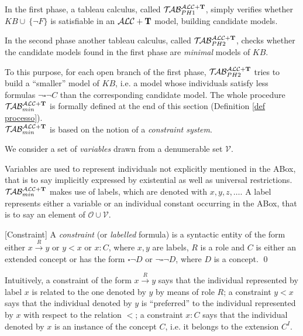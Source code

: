 \documentclass[a4paper, 11pt, oneside]{duthesis}
\newcommand{\tip}{{\bf T}}
\newcommand{\alct}{\mathcal{ALC}+\tip}
\newcommand{\unione} {\cup}
\newcommand{\nott} {\lnot}
\newcommand{\bbox}{\square}
\newcommand{\nuovoc}{\mathrel{{\mathcal{T}\!\mathcal{AB}}}_{min}^{\mathcal{ALC}+\mbox{\scriptsize $\tip$}}}
\newcommand{\primo}{\mathrel{{\mathcal{T}\!\mathcal{AB}}}_{PH 1}^{\mathcal{ALC}+\mbox{\scriptsize $\tip$}}}
\newcommand{\secondo}{\mathrel{{\mathcal{T}\!\mathcal{AB}}}_{PH 2}^{\mathcal{ALC}+\mbox{\scriptsize $\tip$}}}
\newcommand{\trans}[1]{\stackrel{#1}{\longrightarrow}}
\newenvironment{definition}
{\begin{defi} \rm}{\qed \end{defi}}
\newenvironment{definition}
{\begin{defi} \rm}{\qed \end{defi}}
\newtheorem{definition}{Definition}
\newcounter{posu}
\newtheorem{definition}[posu]{Definition}
\begin{document}
\noindent In the first phase, a tableau calculus, called $\primo$, simply verifies whether $KB \unione \ \{\nott F\}$ is satisfiable in an $\alct$ model, building candidate models.

In the second phase another tableau calculus, called $\secondo$, checks whether the candidate models found in the first phase are \emph{minimal} models of $KB$.

To this purpose, for each open branch of the first phase, $\secondo$ tries to build a ``smaller'' model of $KB$, i.e. a model whose individuals satisfy less formulas $\nott \bbox \nott C$ than the corresponding candidate model. The whole procedure $\nuovoc$ is formally defined at the end of this section (Definition \ref{def processo}).\\

$\nuovoc$ is based on the notion of a \emph{constraint system}.

We consider a set of \emph{variables} drawn from a denumerable set $\mathcal{V}$.

Variables are used to represent individuals not explicitly mentioned in the ABox, that is to say implicitly expressed by existential as well as universal restrictions.\\

$\nuovoc$ makes use of labels, which are denoted with $x, y, z, \dots$.
A label represents either a variable or an individual constant occurring in the ABox, that is to say an element of $\mathcal{O} \unione \mathcal{V}$.

\newpage

\begin{definition}[Constraint]
A \emph{constraint} (or \emph{labelled} formula) is a syntactic entity of the form either $x \trans{R} y$ or $y<x$ or $x: C$, where $x, y$ are labels, $R$ is a role and $C$ is either an extended concept or has the form $\bbox \nott D$ or $\nott \bbox \nott D$, where $D$ is a concept.
\end{definition}

\noindent Intuitively, a constraint of the form $x \trans{R} y$ says that the individual represented by label $x$ is related to the one denoted by $y$ by means of role $R$; a constraint $y<x$ says that the individual denoted by $y$ is ``preferred'' to the individual represented by $x$ with respect to the relation $<$; a constraint $x: C$ says that the individual denoted by $x$ is an instance of the concept $C$, i.e. it belongs to the extension $C^I$.\\
\end{document}
